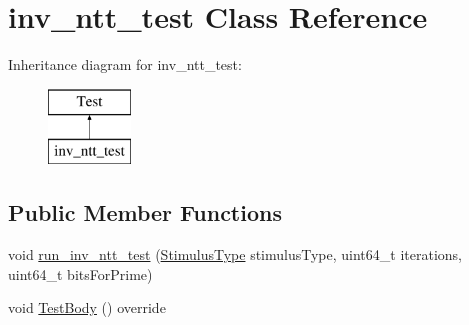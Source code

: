 \hypertarget{classinv__ntt__test}{\section{inv\-\_\-ntt\-\_\-test Class Reference}
\label{classinv__ntt__test}
}
Inheritance diagram for inv\-\_\-ntt\-\_\-test\-:\begin{figure}[H]
\begin{center}
\leavevmode
\includegraphics[height=2.000000cm]{classinv__ntt__test}
\end{center}
\end{figure}
\subsection*{Public Member Functions}
\begin{DoxyCompactItemize}
\item 
void \hyperlink{classinv__ntt__test_a8592b35ff857a63e890076cad1b2fdf8}{run\-\_\-inv\-\_\-ntt\-\_\-test} (\hyperlink{namespacehetest_1_1utils_a17ac57eb86d3ead191cb51163ef63eb0}{Stimulus\-Type} stimulus\-Type, uint64\-\_\-t iterations, uint64\-\_\-t bits\-For\-Prime)
\item 
void \hyperlink{classinv__ntt__test_a316de69045abc6a1223fb6360f036eac}{Test\-Body} () override
\end{DoxyCompactItemize}


